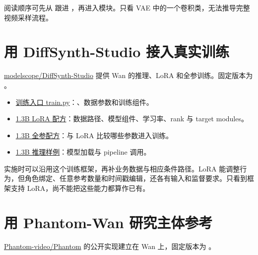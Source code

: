 阅读顺序可先从  跟进 ，再进入模块。只看 VAE 中的一个卷积类，无法推导完整视频采样流程。

\section{用 DiffSynth-Studio 接入真实训练}\label{seedance-m15-ux7528-diffsynth-studio-ux63a5ux5165ux771fux5b9eux8badux7ec3}

\href{https://github.com/modelscope/DiffSynth-Studio}{modelscope/DiffSynth-Studio} 提供 Wan 的推理、LoRA 和全参训练。固定版本为 。

\begin{itemize}
\tightlist
\item
  \href{https://github.com/modelscope/DiffSynth-Studio/blob/d32f72424cd22bc0ea8100cc57559149b4eac933/examples/wanvideo/model_training/train.py}{训练入口 train.py}：、数据参数和训练组件。
\item
  \href{https://github.com/modelscope/DiffSynth-Studio/blob/d32f72424cd22bc0ea8100cc57559149b4eac933/examples/wanvideo/model_training/lora/Wan2.1-T2V-1.3B.sh}{1.3B LoRA 配方}：数据路径、模型组件、学习率、rank 与 target modules。
\item
  \href{https://github.com/modelscope/DiffSynth-Studio/blob/d32f72424cd22bc0ea8100cc57559149b4eac933/examples/wanvideo/model_training/full/Wan2.1-T2V-1.3B.sh}{1.3B 全参配方}：与 LoRA 比较哪些参数进入训练。
\item
  \href{https://github.com/modelscope/DiffSynth-Studio/blob/d32f72424cd22bc0ea8100cc57559149b4eac933/examples/wanvideo/model_inference/Wan2.1-T2V-1.3B.py}{1.3B 推理样例}：模型加载与 pipeline 调用。
\end{itemize}

实施时可以沿用这个训练框架，再补业务数据与相应条件路径。LoRA 能调整行为，但角色绑定、任意参考数量和时间戳编辑，还各有输入和监督要求。只看到框架支持 LoRA，尚不能把这些能力都算作已有。

\section{用 Phantom-Wan 研究主体参考}\label{seedance-m15-ux7528-phantom-wan-ux7814ux7a76ux4e3bux4f53ux53c2ux8003}

\href{https://github.com/Phantom-video/Phantom}{Phantom-video/Phantom} 的公开实现建立在 Wan 上，固定版本为 。

